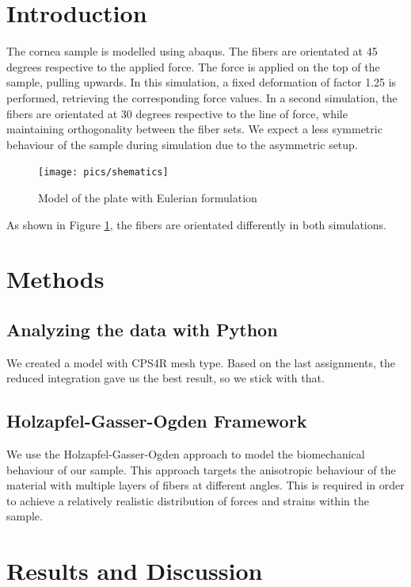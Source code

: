 \documentclass[12pt]{article}
\begin{document}
\tableofcontents
\pagebreak
\section{Introduction}

The cornea sample is modelled using abaqus. The fibers are orientated at 45 degrees respective to
the applied force. The force is applied on the top of the sample, pulling upwards.
In this simulation, a fixed deformation of factor 1.25 is performed, retrieving the corresponding 
force values.
In a second simulation, the fibers are orientated  at 30 degrees respective to the line of force,
while maintaining orthogonality between the fiber sets. We expect a less symmetric behaviour of the sample
during simulation due to the asymmetric setup.

\begin{figure}[!htb]
  \centering
  \texttt{[image: pics/shematics]}
  \caption{Model of the plate with Eulerian formulation}
  \label{fig:1}
\end{figure}

\noindent As shown in Figure \ref{fig:1}, the fibers are orientated differently in both simulations.

\newpage
\section{Methods}

\subsection{Analyzing the data with Python}

We created a model with CPS4R mesh type. Based on the last assignments, the reduced integration
gave us the best result, so we stick with that.

\subsection{Holzapfel-Gasser-Ogden Framework}

We use the Holzapfel-Gasser-Ogden approach to model the biomechanical behaviour of our
sample. This approach targets the anisotropic behaviour of the material with multiple
layers of fibers at different angles. This is required in order to achieve a relatively
realistic distribution of forces and strains within the sample.\cite{holzapfel}




\pagebreak
\section{Results and Discussion}
\end{document}
